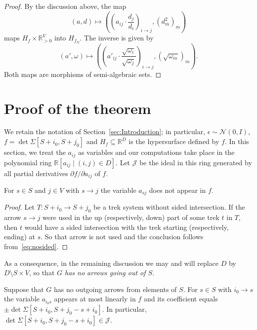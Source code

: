\documentclass[ALCO,ThmDefs,Unicode]{cedram}
\newcommand{\RR}{\mathbb{R}}
\newcommand{\cJ}{\mathcal{J}}
\begin{document}
\begin{proof}
By the discussion above, the map
\[
(a,d) \mapsto \left(\left(a_{ij} \cdot \frac{d_j}{d_i}\right)_{i \to j}, (d_m^2)_m\right)
\]
maps $H_f \times \RR_{>0}^V$ into $H_{f_\Omega}$. The inverse is given by
\[
(a',\omega) \mapsto \left(\left(a'_{ij} \cdot \frac{\sqrt{\omega_i}}{\sqrt{\omega_j}}\right)_{i \to j}, (\sqrt{\omega_m})_m \right).
\]
Both maps are morphisms of semi-algebraic sets.
\end{proof}


\section{Proof of the theorem} \label{sec:Proof}

We retain the notation of Section~\ref{sec:Introduction}; in particular, $\epsilon \sim \mathcal{N}(0,I)$, $f=\det \Sigma[S+i_0,S+j_0]$ and $H_f
\subseteq \RR^D$ is the hypersurface defined by $f$. In this section, we treat the $a_{ij}$ as variables and our computations take place in the polynomial ring $\RR[a_{ij} \mid (i,j) \in D]$. Let $\cJ$ be the ideal in this ring generated by all partial derivatives $\partial f/\partial a_{ij}$ of $f$.

\begin{lemm}\label{lm:sj}
For $s \in S$ and $j \in V$ with $s \to j$ the variable $a_{sj}$ does not appear in $f$.
\end{lemm}

\begin{proof}
Let $T:S+i_0 \to S+j_0$ be a trek system without sided intersection. If the arrow $s \to j$ were used in the up (respectively, down) part of some trek $t$ in $T$, then $t$ would have a sided intersection with the trek starting (respectively, ending) at $s$. So that arrow is not used and the conclusion follows from~\eqref{eq:nosided}.
\end{proof}

As a consequence, in the remaining discussion we may and will replace $D$ by $D \setminus S \times V$, so that \emph{$G$ has no arrows going out of $S$}.

\begin{lemm}\label{lm:i0s}
Suppose that $G$ has no outgoing arrows from elements of $S$. For $s \in S$ with $i_0 \to s$ the variable $a_{i_0s}$ appears at most linearly in $f$ and its coefficient equals $\pm \det
\Sigma[S+i_0,S+j_0-s+i_0]$. In particular, $\det \Sigma[S+i_0,S+j_0-s+i_0]
\in \cJ$.
\end{lemm}
\end{document}
